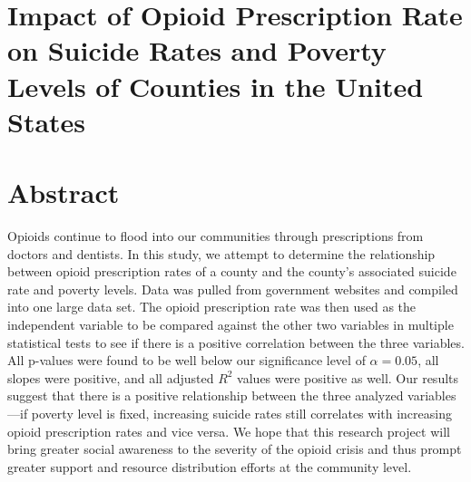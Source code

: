 \documentclass{article}
\newcommand{\<}{\langle}
\renewcommand{\>}{\rangle}
\theoremstyle{definition}
\begin{document}

\vspace{4cm}

\begin{center}
    \section*{Impact of Opioid Prescription Rate on Suicide Rates and Poverty Levels of Counties in the United States}
        
    \vspace{4cm}
    

\section*{Abstract}
    Opioids continue to flood into our communities through prescriptions from doctors and dentists. In this study, we attempt to determine the relationship between opioid prescription rates of a county and the county’s associated suicide rate and poverty levels. Data was pulled from government websites and compiled into one large data set. The opioid prescription rate was then used as the independent variable to be compared against the other two variables in multiple statistical tests to see if there is a positive correlation between the three variables. All p-values were found to be well below our significance level of $\alpha = 0.05$, all slopes were positive, and all adjusted $R^2$ values were positive as well. Our results suggest that there is a positive relationship between the three analyzed variables—if poverty level is fixed, increasing suicide rates still correlates with increasing opioid prescription rates and vice versa. We hope that this research project will bring greater social awareness to the severity of the opioid crisis and thus prompt greater support and resource distribution efforts at the community level. 
\end{center}

\newpage
\end{document}
